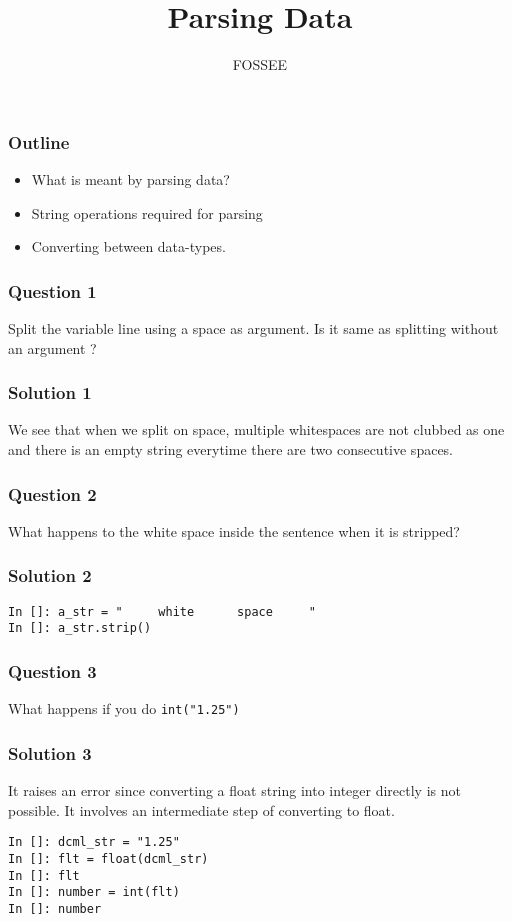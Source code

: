 \documentclass[presentation]{beamer}
\title{Parsing Data}
\author{FOSSEE}
\date{}
\begin{document}
\maketitle









\begin{frame}
\frametitle{Outline}
\label{sec-1}

\begin{itemize}
\item What is meant by parsing data?
\item String operations required for parsing
\item Converting between data-types.
\end{itemize}
\end{frame}
\begin{frame}
\frametitle{Question 1}
\label{sec-2}

  Split the variable line using a space as argument. Is it same as
  splitting without an argument ?
\end{frame}
\begin{frame}
\frametitle{Solution 1}
\label{sec-3}

  We see that when we split on space, multiple whitespaces are not
  clubbed as one and there is an empty string everytime there are two
  consecutive spaces.
\end{frame}
\begin{frame}
\frametitle{Question 2}
\label{sec-4}

  What happens to the white space inside the sentence when it is
  stripped? 
\end{frame}
\begin{frame}[fragile]
\frametitle{Solution 2}
\label{sec-5}

\lstset{language=Python}
\begin{lstlisting}
In []: a_str = "     white      space     "
In []: a_str.strip()
\end{lstlisting}
\end{frame}
\begin{frame}
\frametitle{Question 3}
\label{sec-6}

  What happens if you do \texttt{int("1.25")}
\end{frame}
\begin{frame}[fragile]
\frametitle{Solution 3}
\label{sec-7}

  It raises an error since converting a float string into integer
  directly is not possible. It involves an intermediate step of
  converting to float.
\lstset{language=Python}
\begin{lstlisting}
In []: dcml_str = "1.25"
In []: flt = float(dcml_str)
In []: flt
In []: number = int(flt)
In []: number
\end{lstlisting}
\end{frame}
\end{document}
